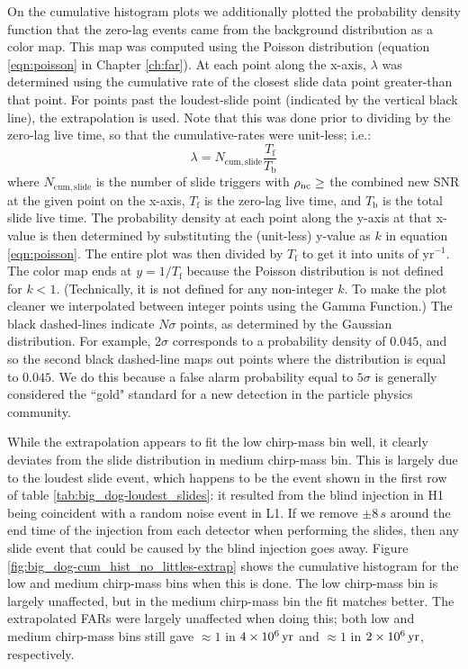 On the cumulative histogram plots we additionally plotted the probability
density function that the zero-lag events came from the background distribution
as a color map. This map was computed using the Poisson distribution (equation
\ref{eqn:poisson} in Chapter \ref{ch:far}). At each point along the x-axis,
$\lambda$ was determined using the cumulative rate of the closest slide data
point greater-than that point. For points past the loudest-slide point
(indicated by the vertical black line), the extrapolation is used. Note that
this was done prior to dividing by the zero-lag live time, so that the
cumulative-rates were unit-less; i.e.:
\begin{equation*}
\lambda = N_{\mathrm{cum,slide}} \frac{T_{\mathrm{f}}}{T_{\mathrm{b}}}
\end{equation*}
where $N_{\mathrm{cum,slide}}$ is the number of slide triggers with $\rho_{\mathrm{nc}}
\geq$ the combined new \ac{SNR} at the given point on the x-axis,
$T_{\mathrm{f}}$ is the zero-lag live time, and $T_{\mathrm{b}}$ is the total
slide live time. The probability density at each point along the y-axis at that
x-value is then determined by substituting the (unit-less) y-value as $k$ in
equation \ref{eqn:poisson}. The entire plot was then divided by $T_{\mathrm{f}}$ to
get it into units of yr$^{-1}$. The color map ends at $y = 1 / T_{\mathrm{f}}$
because the Poisson distribution is not defined for $k < 1$. (Technically, it
is not defined for any non-integer $k$. To make the plot cleaner we
interpolated between integer points using the Gamma Function.) The black
dashed-lines indicate $N\sigma$ points, as determined by the Gaussian
distribution. For example, $2\sigma$ corresponds to a probability density of
$0.045$, and so the second black dashed-line maps out points where the
distribution is equal to $0.045$. We do this because a false alarm probability
equal to $5\sigma$ is generally considered the ``gold" standard for a new
detection in the particle physics community.

While the extrapolation appears to fit the low chirp-mass bin well, it clearly
deviates from the slide distribution in medium chirp-mass bin. This is largely
due to the loudest slide event, which happens to be the event shown in the
first row of table \ref{tab:big_dog-loudest_slides}: it resulted from the blind
injection in H1 being coincident with a random noise event in L1. If we remove
$\pm8\,s$ around the end time of the injection from each detector when
performing the slides, then any slide event that could be caused by the blind
injection goes away. Figure \ref{fig:big_dog-cum_hist_no_littles-extrap} shows
the cumulative histogram for the low and medium chirp-mass bins when this is
done. The low chirp-mass bin is largely unaffected, but in the medium
chirp-mass bin the fit matches better. The extrapolated \acp{FAR} were largely
unaffected when doing this; both low and medium chirp-mass bins still gave
$\approx 1$ in $4\times 10^{6}\,\mathrm{yr}$ and $\approx 1$ in $2\times 10^{6}\,\mathrm{yr}$,
respectively.

